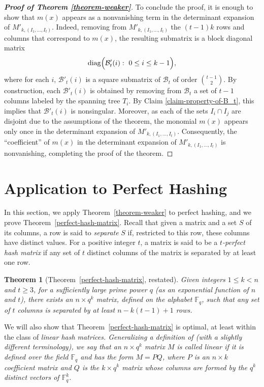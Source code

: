 \documentclass[11pt]{article}
\newtheorem*{theorem*}{Theorem}
\newcommand\black[1]{{\color{black} #1}}
\begin{document}
\begin{proof}[\textbf{Proof of Theorem \ref{theorem-weaker}}]
To conclude the proof, it is enough to show that $m(x)$ appears as a nonvanishing term in the determinant expansion of $M'_{k,(I_1,\ldots,I_t)}$. Indeed, removing from $M'_{k,(I_1,\ldots,I_t)}$ the $(t-1)k$ rows and columns that correspond to $m(x)$, the resulting submatrix is a block diagonal matrix
\[
{\rm diag}\Big(\mathcal{B}'_t(i):~0\le i\le k-1\Big),
\]
where for each $i$, $\mathcal{B}'_t(i)$ is a square submatrix of $\mathcal{B}_t$ of order $\binom{t-1}{2}$. By construction, each $\mathcal{B}'_t(i)$ is obtained by removing from $\mathcal{B}_t$ a set of $t-1$ columns labeled by the spanning tree $T_i$.  By Claim \ref{claim-property-of-B_t}, this implies that $\mathcal{B}'_t(i)$ is nonsingular.
Moreover, as each of the sets $I_i \cap I_j$ are disjoint due to the assumptions of the theorem, the monomial $m(x)$ appears only once in the determinant expansion of $M'_{k,(I_1, \ldots, I_t)}$.
Consequently, the ``coefficient'' of $m(x)$ in the determinant expansion of $M'_{k,(I_1,\ldots,I_t)}$ is nonvanishing, completing the proof of the theorem.
\end{proof}

\section{Application to Perfect Hashing}
\label{phf}

In this section, we apply Theorem~\ref{theorem-weaker} to perfect hashing, and we prove Theorem~\ref{perfect-hash-matrix}.
\black{Recall that given a matrix and a set $S$ of its columns, a row is said to {\it separate} $S$ if, restricted to this row, these columns have distinct values. For a positive integer $t$, a matrix is said to be a {\it $t$-perfect hash matrix} if any set of $t$ distinct columns of the matrix is separated by at least one row. }


\begin{theorem*}[Theorem~\ref{perfect-hash-matrix}, restated]
Given integers $1\le k<n$ and $t\ge 3$, for a sufficiently large prime power $q$ \black{(as an \black{exponential} function of $n$ and $t$)}, there exists an $n\times q^k$ matrix, defined on the alphabet $\mathbb{F}_q$, such that any set of $t$ columns is separated by at least $n-k(t-1)+1$ rows.
\end{theorem*}

We will also show that Theorem~\ref{perfect-hash-matrix} is optimal, at least within the class of \em linear \em hash matrices.
Generalizing a definition of \cite{Blackburn1998Optimal} (with a slightly different terminology), we say that an $n\times q^k$ matrix
$M$ is called {\it linear} if it is defined over the  field $\mathbb{F}_q$ and has the form $M=PQ$, where $P$ is an $n\times k$ coefficient matrix and $Q$ is the $k\times q^k$ matrix whose columns are formed by the $q^k$ distinct vectors of $\mathbb{F}_q^k$.
\end{document}
